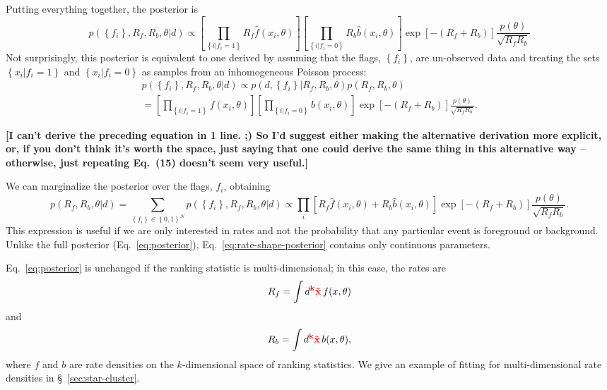 \documentclass[aps,prd]{revtex4-1}
\newcommand{\mathset}[1]{\left\{ #1 \right\}}
\newcommand{\ilya}[1]{{\color{red} \bf #1}}
\begin{document}
Putting everything together, the posterior is
\begin{equation}
  \label{eq:posterior}
  p\left( \mathset{f_i}, R_f, R_b, \theta | d \right) \propto \left[
    \prod_{\mathset{i | f_i = 1}} R_f \hat{f}\left(x_i, \theta\right) \right]
  \left[ \prod_{\mathset{i | f_i = 0}} R_b \hat{b}\left( x_i, \theta\right)
  \right] \exp\left[ - \left(R_f + R_b\right) \right]
  \frac{p(\theta)}{\sqrt{R_f R_b}}
\end{equation}
Not surprisingly, this posterior is equivalent to one derived by assuming
that the flags, $\mathset{f_i}$, are un-observed data and treating the
sets $\mathset{x_i | f_i = 1}$ and $\mathset{x_i | f_i = 0}$ as
samples from an inhomogeneous Poisson process:
\begin{multline}
  p\left( \mathset{f_i}, R_f, R_b, \theta | d \right) \propto p\left(
    d, \mathset{f_i} | R_f, R_b, \theta \right) p\left( R_f, R_b,
    \theta \right) \\ = \left[ \prod_{\mathset{i|f_i=1}} f\left( x_i,
      \theta \right) \right] \left[ \prod_{\mathset{i|f_i=0}} b\left(
      x_i, \theta\right) \right] \exp\left[ -\left( R_f + R_b\right)
  \right] \frac{p(\theta)}{\sqrt{R_f R_b}}.
\end{multline}

\ilya{[I can't derive the preceding equation in 1 line. ;)  So I'd suggest either making the alternative derivation more explicit, or, if you don't think it's worth the space, just saying that one could derive the same thing in this alternative way -- otherwise, just repeating Eq.~(15) doesn't seem very useful.]}
 
We can marginalize the posterior over the flags, $f_i$, obtaining
\begin{equation}
  \label{eq:rate-shape-posterior}
  p\left( R_f, R_b, \theta | d \right) = \sum_{\mathset{f_i} \in
    \mathset{0,1}^N} p\left( \mathset{f_i}, R_f, R_b, \theta | d \right)
  \propto \prod_{i} \left[ R_f \hat{f}\left(x_i, \theta\right) + R_b
    \hat{b}\left( x_i, \theta\right) \right] \exp\left[-\left( R_f +
      R_b \right) \right] \frac{p(\theta)}{\sqrt{R_f R_b}}.
\end{equation}
This expression is useful if we are only interested in rates and not
the probability that any particular event is foreground or background.
Unlike the full posterior (Eq.~\eqref{eq:posterior}),
Eq.~\eqref{eq:rate-shape-posterior} contains only continuous
parameters.

Eq.~\eqref{eq:posterior} is unchanged if the ranking statistic is
multi-dimensional; in this case, the rates are 
\begin{equation}
  R_f = \int d^\ilya{k} \ilya{\vec{x}} \, f(x, \theta)
\end{equation}
and
\begin{equation}
  R_b = \int d^\ilya{k} \ilya{\vec{x}} \, b(x, \theta),  
\end{equation}
where $f$ and $b$ are rate densities on the \ilya{$k$}-dimensional space of
ranking statistics.  We give an example of fitting for
multi-dimensional rate densities in \S~\ref{sec:star-cluster}.
\end{document}
